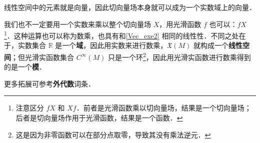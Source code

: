 线性空间中的元素就是向量，因此切向量场本身就可以成为一个实数域上的向量．

我们也不一定要用一个实数来乘以整个切向量场 $X$，用光滑函数 $f$ 也可以：$fX$\footnote{注意区分 $fX$ 和 $Xf$．前者是光滑函数乘以切向量场，结果是一个切向量场；后者是切向量场作用于光滑函数，结果是一个函数．}．这种运算也可以称为数乘，也具有和\autoref{Vec_exe2} 相同的线性性．不同之处在于，实数集合 $\mathbb{R}$ 是一个\textbf{域}，因此用实数来进行数乘，$\mathfrak{X}(M)$ 就构成一个\textbf{线性空间}；但光滑实函数集合 $C^\infty(M)$ 只是一个环\footnote{这是因为非零函数可以在部分点取零，导致其没有乘法逆元．}，因此用光滑实函数进行数乘得到的是一个\textbf{模}．

更多拓展可参考\textbf{外代数}词条．



